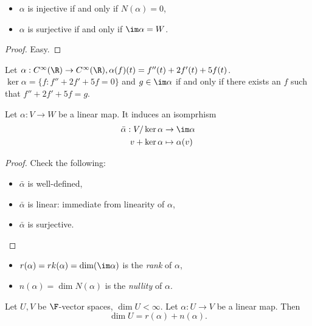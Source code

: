 \documentclass[a4paper]{article}
\theoremstyle{definition}
\begin{document}
\begin{proposition}\leavevmode
  \begin{itemize}
  \item \(\alpha\) is injective if and only if \(N(\alpha) = 0\),
  \item \(\alpha\) is surjective if and only if \(\im \alpha = W\).
  \end{itemize}
\end{proposition}

\begin{proof}
  Easy.
\end{proof}

\begin{eg}
  Let \(\alpha: C^\infty(\R) \to C^\infty(\R), \alpha(f)(t) = f''(t)+2f'(t)+5f(t)\). \(\ker \alpha = \{f:f''+2f'+5f=0\}\) and \(g\in \im \alpha\) if and only if there exists an \(f\) such that \(f''+2f'+5f=g\).
\end{eg}

\begin{theorem}
  Let \(\alpha: V\to W\) be a linear map. It induces an isomprhism
  \begin{align*}
    \bar \alpha: V/\ker \alpha &\to \im \alpha \\
    v + \ker \alpha &\mapsto \alpha(v)
  \end{align*}
\end{theorem}

\begin{proof}
  Check the following:
  \begin{itemize}
  \item \(\bar \alpha\) is well-defined,
  \item \(\bar \alpha\) is linear: immediate from linearity of \(\alpha\),
  \item \(\bar \alpha\) is surjective.
  \end{itemize}
\end{proof}

\begin{definition}\leavevmode
  \begin{itemize}
  \item \(r(\alpha) = rk(\alpha) = \dim( \im \alpha)\) is the \emph{rank} of \(\alpha\),
  \item \(n(\alpha) = \dim N(\alpha)\) is the \emph{nullity} of \(\alpha\).
  \end{itemize}
\end{definition}

\begin{theorem}
  Let \(U, V\) be \(\F\)-vector spaces, \(\dim U < \infty\). Let \(\alpha:U\to V\) be a linear map. Then
  \[
\dim U = r(\alpha) + n(\alpha).
  \]
\end{theorem}
\end{document}
